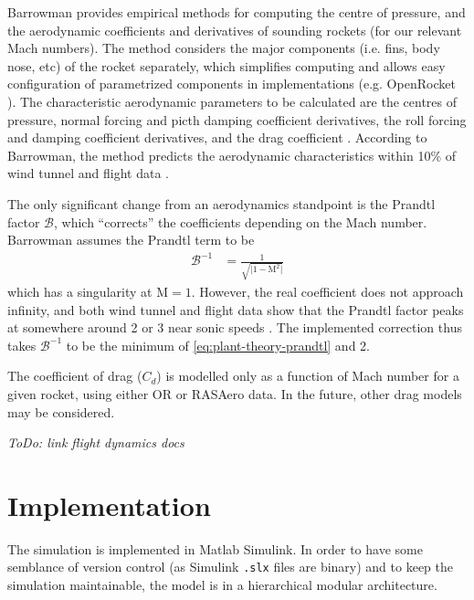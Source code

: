 Barrowman \cite{barrowman1967} provides empirical methods for computing the centre of pressure, and the aerodynamic coefficients and derivatives of sounding rockets (for our relevant Mach numbers). 
The method considers the major components (i.e. fins, body nose, etc) of the rocket separately, which simplifies computing and allows easy configuration of parametrized components in implementations (e.g. OpenRocket \cite{niskanen2009, or-manual}).
The characteristic aerodynamic parameters to be calculated are the centres of pressure, normal forcing and picth damping coefficient derivatives, the roll forcing and damping coefficient derivatives, and the drag coefficient \cite{barrowman1967}.
According to Barrowman, the method predicts the aerodynamic characteristics within 10\% of wind tunnel and flight data \cite{barrowman1967}.

The only significant change from an aerodynamics standpoint is the Prandtl factor $\mathcal{B}$, which ``corrects'' the coefficients depending on the Mach number.
Barrowman assumes the Prandtl term to be
\begin{align}
    \mathcal{B}^{-1} &= \frac{1}{\sqrt{\lvert 1-\mathrm{M}^2 \rvert}} \label{eq:plant-theory-prandtl}
\end{align}
which has a singularity at $\mathrm{M} = 1$.
However, the real coefficient does not approach infinity, and both wind tunnel and flight data show that the Prandtl factor peaks at somewhere around 2 or 3 near sonic speeds \cite{stengel2004}.
The implemented correction thus takes $\mathcal{B^{-1}}$ to be the minimum of \ref{eq:plant-theory-prandtl} and 2.

The coefficient of drag ($C_d$) is modelled only as a function of Mach number for a given rocket, using either OR or RASAero data. In the future, other drag models may be considered.

\emph{ToDo: link flight dynamics docs}

\section{Implementation}
The simulation is implemented in Matlab Simulink.
In order to have some semblance of version control (as Simulink \texttt{.slx} files are binary) and to keep the simulation maintainable, the model is in a hierarchical modular architecture.

